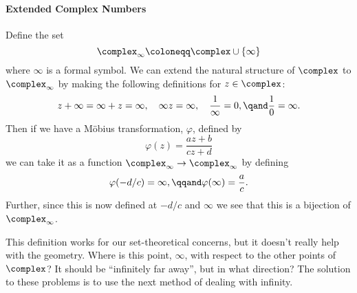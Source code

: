 \documentclass[fleqn]{NotesClass}
\begin{document}
    \paragraph{Extended Complex Numbers}
    Define the set
    \begin{equation}
        \complex_{\infty} \coloneqq \complex \cup \{\infty\}
    \end{equation}
    where \(\infty\) is a formal symbol.
    We can extend the natural structure of \(\complex\) to \(\complex_{\infty}\) by making the following definitions for \(z \in \complex\):
    \begin{equation}
        z + \infty = \infty + z = \infty, \quad \infty z = \infty, \quad \frac{1}{\infty} = 0, \qand \frac{1}{0} = \infty.
    \end{equation}
    Then if we have a M\"obius transformation, \(\varphi\), defined by
    \begin{equation}
        \varphi(z) = \frac{az + b}{cz + d}
    \end{equation}
    we can take it as a function \(\complex_{\infty} \to \complex_{\infty}\) by defining
    \begin{equation}
        \varphi(-d/c) = \infty, \qqand \varphi(\infty) = \frac{a}{c}.
    \end{equation}
    Further, since this is now defined at \(-d/c\) and \(\infty\) we see that this is a bijection of \(\complex_{\infty}\).
    
    This definition works for our set-theoretical concerns, but it doesn't really help with the geometry.
    Where is this point, \(\infty\), with respect to the other points of \(\complex\)?
    It should be \enquote{infinitely far away}, but in what direction?
    The solution to these problems is to use the next method of dealing with infinity.
    
\end{document}
